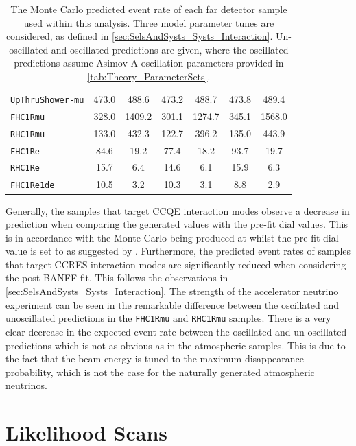 \begin{table}[ht!]
\begin{tabular}{|l|c|c|c|c|c|c|}
      \texttt{UpThruShower-mu} & 473.0 & 488.6 & 473.2 & 488.7 & 473.8 & 489.4 \\
      \texttt{FHC1Rmu} & 328.0 & 1409.2 & 301.1 & 1274.7 & 345.1 & 1568.0 \\
      \texttt{RHC1Rmu} & 133.0 & 432.3 & 122.7 & 396.2 & 135.0 & 443.9 \\
      \texttt{FHC1Re} & 84.6 & 19.2 & 77.4 & 18.2 & 93.7 & 19.7 \\
      \texttt{RHC1Re} & 15.7 & 6.4 & 14.6 & 6.1 & 15.9 & 6.3 \\
      \texttt{FHC1Re1de} & 10.5 & 3.2 & 10.3 & 3.1 & 8.8 & 2.9 \\
      \hline
      \hline
    \end{tabular}
    \caption{The Monte Carlo predicted event rate of each far detector sample used within this analysis. Three model parameter tunes are considered, as defined in \autoref{sec:SelsAndSysts_Systs_Interaction}. Un-oscillated and oscillated predictions are given, where the oscillated predictions assume Asimov A oscillation parameters provided in \autoref{tab:Theory_ParameterSets}.}
    \label{tab:OscillationAnalysis_MCPred}
\end{table}

Generally, the samples that target CCQE interaction modes observe a decrease in prediction when comparing the generated values with the pre-fit dial values. This is in accordance with the Monte Carlo being produced at  \cite{Aguilar_Arevalo_2010} whilst the pre-fit dial value is set to  as suggested by \cite{t2k_tn_344}. Furthermore, the predicted event rates of samples that target CCRES interaction modes are significantly reduced when considering the post-BANFF fit. This follows the observations in \autoref{sec:SelsAndSysts_Systs_Interaction}. The strength of the accelerator neutrino experiment can be seen in the remarkable difference between the oscillated and unoscillated predictions in the \texttt{FHC1Rmu} and \texttt{RHC1Rmu} samples. There is a very clear decrease in the expected event rate between the oscillated and un-oscillated predictions which is not as obvious as in the atmospheric samples. This is due to the fact that the beam energy is tuned to the maximum disappearance probability, which is not the case for the naturally generated atmospheric neutrinos.

\section{Likelihood Scans}
\label{sec:OscillationAnalysis_LLHScans}

